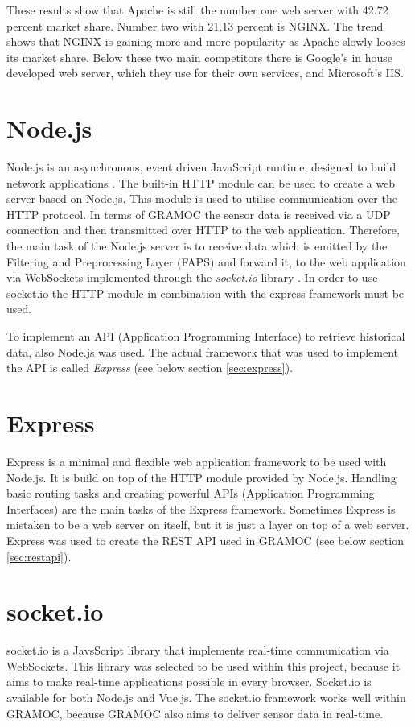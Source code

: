 These results show that Apache is still the number one web server with 42.72 percent market share. Number two with 21.13 percent is NGINX. The trend shows that NGINX is gaining more and more popularity as Apache slowly looses its market share. Below these two main competitors there is Google's in house developed web server, which they use for their own services, and Microsoft's IIS.

\section{Node.js}
\label{sec:nodejs}
Node.js is an asynchronous, event driven JavaScript runtime, designed to build network applications \autocite{Node}. The built-in HTTP module can be used to create a web server based on Node.js. This module is used to utilise communication over the HTTP protocol. In terms of GRAMOC the sensor data is received via a UDP connection and then transmitted over HTTP to the web application. Therefore, the main task of the Node.js server is to receive data which is emitted by the Filtering and Preprocessing Layer (FAPS) and forward it, to the web application via WebSockets implemented through the \textit{socket.io} library \autocite{socketio}. In order to use socket.io the HTTP module in combination with the express framework must be used.

To implement an API (Application Programming Interface) to retrieve historical data, also Node.js was used. The actual framework that was used to implement the API is called \textit{Express} (see below section \vref{sec:express}).

\section{Express}
\label{sec:express}
Express is a minimal and flexible web application framework to be used with Node.js. It is build on top of the HTTP module provided by Node.js. Handling basic routing tasks and creating powerful APIs (Application Programming Interfaces) are the main tasks of the Express framework. Sometimes Express is mistaken to be a web server on itself, but it is just a layer on top of a web server. Express was used to create the REST API used in GRAMOC (see below section \vref{sec:restapi}).

\section{socket.io}
\label{sec:socketio}
socket.io is a JavsScript library that implements real-time communication via WebSockets. This library was selected to be used within this project, because it aims to make real-time applications possible in every browser. Socket.io is available for both Node.js and Vue.js. The socket.io framework works well within GRAMOC, because GRAMOC also aims to deliver sensor data in real-time.

